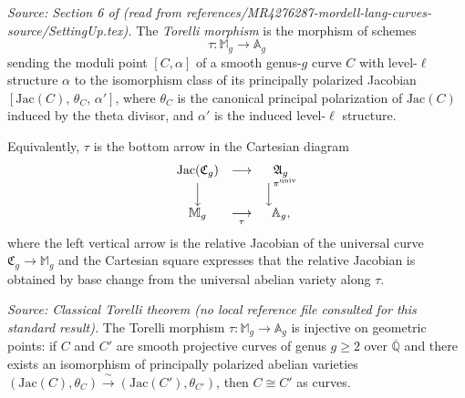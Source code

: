 \begin{definition}
  \label{def:torelli_map}
  \textit{Source: Section 6 of \cite{MR4276287-mordell-lang-curves} (read from
  references/MR4276287-mordell-lang-curves-source/SettingUp.tex).}
  The \emph{Torelli morphism} is the morphism of schemes
  \[
    \tau \colon \mathbb{M}_g \longrightarrow \mathbb{A}_g
  \]
  sending the moduli point \([C, \alpha]\) of a smooth genus-\(g\) curve \(C\)
  with level-\(\ell\) structure \(\alpha\) to the isomorphism class of its
  principally polarized Jacobian \([\mathrm{Jac}(C),\, \theta_C,\, \alpha']\),
  where \(\theta_C\) is the canonical principal polarization of \(\mathrm{Jac}(C)\)
  induced by the theta divisor, and \(\alpha'\) is the induced level-\(\ell\)
  structure.

  Equivalently, \(\tau\) is the bottom arrow in the Cartesian diagram
  \[
    \begin{array}{ccc}
      \mathrm{Jac}(\mathfrak{C}_g) & \longrightarrow & \mathfrak{A}_g \\
      \Big\downarrow & & \Big\downarrow^{\pi^{\mathrm{univ}}} \\
      \mathbb{M}_g & \underset{\tau}{\longrightarrow} & \mathbb{A}_g ,
    \end{array}
  \]
  where the left vertical arrow is the relative Jacobian of the universal curve
  \(\mathfrak{C}_g \to \mathbb{M}_g\) and the Cartesian square expresses that
  the relative Jacobian is obtained by base change from the universal abelian
  variety along \(\tau\).
\end{definition}

\begin{theorem}
  \label{thm:torelli_injective}
  \textit{Source: Classical Torelli theorem (no local reference file consulted for
  this standard result).}
  The Torelli morphism \(\tau \colon \mathbb{M}_g \to \mathbb{A}_g\) is
  injective on geometric points: if \(C\) and \(C'\) are smooth projective
  curves of genus \(g \ge 2\) over \(\overline{\mathbb{Q}}\) and there exists
  an isomorphism of principally polarized abelian varieties
  \((\mathrm{Jac}(C), \theta_C) \xrightarrow{\;\sim\;} (\mathrm{Jac}(C'), \theta_{C'})\),
  then \(C \cong C'\) as curves.
\end{theorem}


